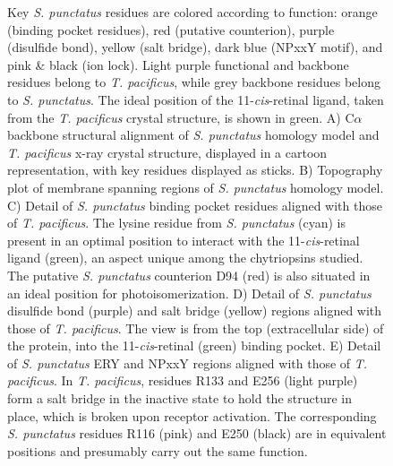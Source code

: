 \begin{figure}[hb]
  \caption[Structural details of the \textit{S. punctatus} chytriopsin homology model.]{Key \textit{S. punctatus} residues are colored according to function: orange (binding pocket residues), red (putative counterion), purple (disulfide bond), yellow (salt bridge), dark blue (NPxxY motif), and pink \& black (ion lock). Light purple functional and backbone residues belong to \textit{T. pacificus}, while grey backbone residues belong to \textit{S. punctatus}. The ideal position of the 11-\textit{cis}-retinal ligand, taken from the \textit{T. pacificus} crystal structure, is shown in green. A) C$\alpha$ backbone structural alignment of \textit{S. punctatus} homology model and \textit{T. pacificus} x-ray crystal structure, displayed in a cartoon representation, with key residues displayed as sticks. B) Topography plot of membrane spanning regions of \textit{S. punctatus} homology model. C) Detail of \textit{S. punctatus} binding pocket residues aligned with those of \textit{T. pacificus}. The lysine residue from \textit{S. punctatus} (cyan) is present in an optimal position to interact with the 11-\textit{cis}-retinal ligand (green), an aspect unique among the chytriopsins studied. The putative \textit{S. punctatus} counterion D94 (red) is also situated in an ideal position for photoisomerization. D) Detail of \textit{S. punctatus} disulfide bond (purple) and salt bridge (yellow) regions aligned with those of \textit{T. pacificus}. The view is from the top (extracellular side) of the protein, into the 11-\textit{cis}-retinal (green) binding pocket. E) Detail of \textit{S. punctatus} ERY and NPxxY regions aligned with those of \textit{T. pacificus}. In \textit{T. pacificus}, residues R133 and E256 (light purple) form a salt bridge in the inactive state to hold the structure in place, which is broken upon receptor activation. The corresponding \textit{S. punctatus} residues R116 (pink) and E250 (black) are in equivalent positions and presumably carry out the same function.}
  \label{fig:ChRhodS_SpStructure}
\end{figure}

